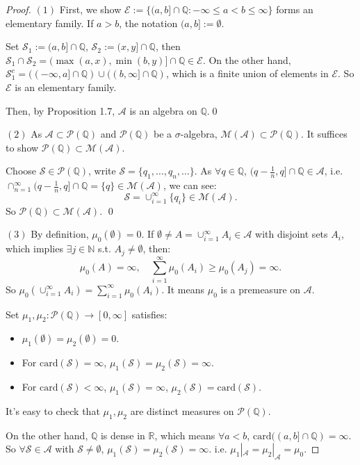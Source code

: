 \documentclass{article}
\newcommand{\Sc}{\mathcal{S}}
\newcommand{\E}{\mathcal{E}}
\newcommand{\A}{\mathcal{A}}
\newcommand{\cp}[2]{\cup_{#1=1}^{#2}}
\newcommand{\sm}[2]{\sum_{#1=1}^{#2}}
\newcommand{\M}{\mathcal{M}}
\begin{document}
\begin{proof}
    $(1)$
    First, we show $\E:=\{(a,b]\cap\mathbb{Q}:
    -\infty\le a<b\le\infty\}$ forms an elementary family.
    If $a>b$, the notation $(a,b]:=\emptyset$.

    Set $\Sc_{1}:=(a,b]\cap\mathbb{Q}$, 
    $\Sc_2:=(x,y]\cap\mathbb{Q}$, 
    then $\Sc_1\cap\Sc_2=(\max(a,x),\min(b,y)]\cap\mathbb{Q}\in\E$.
    On the other hand, $\Sc_1^{c}=((-\infty,a]\cap\mathbb{Q})
    \cup((b,\infty]\cap\mathbb{Q})$, 
    which is a finite union of elements in $\E$. 
    So $\E$ is an elementary family. 

    Then, by Proposition 1.7, $\A$ is an algebra on $\mathbb{Q}$.\qed

    $(2)$ As $\A\subset\mathcal{P}(\mathbb{Q})$ and 
    $\mathcal{P}(\mathbb{Q})$ be a $\sigma$-algebra, 
    $\M(\A)\subset\mathcal{P}(\mathbb{Q})$. 
    It suffices to show $\mathcal{P}(\mathbb{Q})\subset\M(\A)$.
    
    Choose $\Sc\in\mathcal{P}(\mathbb{Q})$, write 
    $\Sc=\{q_{1},\ldots,q_{n},\ldots\}$. As $\forall q\in\mathbb{Q}$, 
    $(q-\frac{1}{n},q]\cap\mathbb{Q}\in\A$, i.e. 
    $\cap_{n=1}^{\infty}(q-\frac{1}{n},q]\cap\mathbb{Q}=\{q\}\in\M(\A)$, we can see:
    \begin{displaymath}
        \Sc=\cp{i}{\infty}\{q_{i}\}\in\M(\A).
    \end{displaymath}
    So $\mathcal{P}(\mathbb{Q})\subset\M(\A)$. \qed

    $(3)$ By definition, $\mu_{0}(\emptyset)=0$. 
    If $\emptyset\neq A=\cp{i}{\infty}A_i\in\A$ 
    with disjoint sets $A_i$, which implies 
    $\exists j\in\mathbb{N}$ s.t. $A_{j}\neq \emptyset$, then:
    \begin{displaymath}
        \mu_{0}(A)=\infty,\quad\sm{i}{\infty}\mu_{0}(A_{i})\ge\mu_{0}(A_{j})
        =\infty.
    \end{displaymath}
    So $\mu_{0}(\cp{i}{\infty}A_{i})=\sm{i}{\infty}\mu_{0}(A_i)$. 
    It means $\mu_{0}$ is a premeasure on $\A$. 

    Set $\mu_1,\mu_2:
    \mathcal{P}(\mathbb{Q})\rightarrow[0,\infty]$ satisfies: 
    \begin{itemize}
        \item $\mu_1(\emptyset)=\mu_2(\emptyset)=0$.
        \item For $\text{card}(\Sc)=\infty$, 
        $\mu_{1}(\Sc)=\mu_2(\Sc)=\infty$.
        \item For $\text{card}(\Sc)<\infty$, 
        $\mu_{1}(\Sc)=\infty$, $\mu_{2}(\Sc)=\text{card}(\Sc)$.
    \end{itemize}
    It's easy to check that $\mu_{1},\mu_{2}$ are distinct 
    measures on $\mathcal{P}(\mathbb{Q})$. 
    
    On the other hand, $\mathbb{Q}$ is dense in $\mathbb{R}$, 
    which means $\forall a<b$, 
    $\text{card}((a,b]\cap\mathbb{Q})=\infty$.
    So $\forall\Sc\in\A$ with $\Sc\neq\emptyset$, 
    $\mu_{1}(\Sc)=\mu_2(\Sc)=\infty$. 
    i.e. $\mu_1|_{\A}=\mu_{2}|_{\A}=\mu_{0}$.\qedhere
\end{proof}
\end{document}
